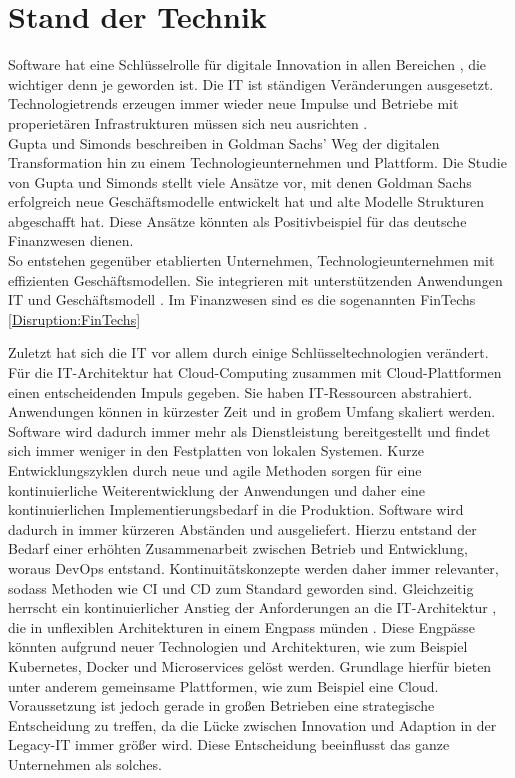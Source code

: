 \section{Stand der Technik}
Software hat eine Schlüsselrolle für digitale Innovation in allen Bereichen \cite{Alt2017}, die wichtiger denn je geworden ist. Die IT ist ständigen Veränderungen ausgesetzt. Technologietrends erzeugen immer wieder neue Impulse und Betriebe mit properietären Infrastrukturen müssen sich neu ausrichten \cite{Bussmann2006}.
\medskip
\\
Gupta und Simonds beschreiben in \cite{Gupta:2017} Goldman Sachs' Weg der digitalen Transformation hin zu einem Technologieunternehmen und Plattform. 
Die Studie von Gupta und Simonds stellt viele Ansätze vor, mit denen Goldman Sachs erfolgreich neue Geschäftsmodelle entwickelt hat und alte Modelle Strukturen abgeschafft hat. Diese Ansätze könnten als Positivbeispiel für das deutsche Finanzwesen dienen.
\medskip
\\
So entstehen gegenüber etablierten Unternehmen, Technologieunternehmen mit effizienten Geschäftsmodellen. Sie integrieren mit unterstützenden Anwendungen IT und Geschäftsmodell \cite{Bussmann2006}. Im Finanzwesen sind es die sogenannten FinTechs \ref{Disruption:FinTechs}

Zuletzt hat sich die IT vor allem durch einige Schlüsseltechnologien verändert. Für die IT-Architektur hat Cloud-Computing zusammen mit Cloud-Plattformen einen entscheidenden Impuls gegeben. Sie haben IT-Ressourcen abstrahiert. Anwendungen können in kürzester Zeit und in großem Umfang skaliert werden. Software wird dadurch immer mehr als Dienstleistung bereitgestellt und findet sich immer weniger in den Festplatten von lokalen Systemen. Kurze Entwicklungszyklen durch neue und agile Methoden sorgen für eine kontinuierliche Weiterentwicklung der Anwendungen und daher eine kontinuierlichen Implementierungsbedarf in die Produktion. Software wird dadurch in immer kürzeren Abständen und ausgeliefert. Hierzu entstand der Bedarf einer erhöhten Zusammenarbeit zwischen Betrieb und Entwicklung, woraus DevOps entstand. Kontinuitätskonzepte werden daher immer relevanter, sodass Methoden wie \ac{CI} und \ac{CD} zum Standard geworden sind. Gleichzeitig herrscht ein kontinuierlicher Anstieg der Anforderungen an die IT-Architektur \cite{Bussmann2006}, die in unflexiblen Architekturen in einem Engpass münden \cite{Brockhoff2006, Bussmann2006}. Diese Engpässe könnten aufgrund neuer Technologien und Architekturen, wie zum Beispiel Kubernetes, Docker und Microservices gelöst werden. Grundlage hierfür bieten unter anderem gemeinsame Plattformen, wie zum Beispiel eine Cloud. Voraussetzung ist jedoch gerade in großen Betrieben eine strategische Entscheidung zu treffen, da die Lücke zwischen Innovation und Adaption in der Legacy-IT immer größer wird. Diese Entscheidung beeinflusst das ganze Unternehmen als solches.

